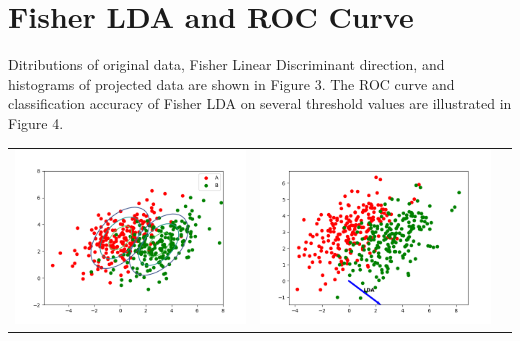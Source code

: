 \documentclass{article}
\begin{document}
\section{Fisher LDA and ROC Curve}
Ditributions of original data, Fisher Linear Discriminant direction, and histograms of projected data are shown in Figure 3. The ROC curve and classification accuracy of Fisher LDA on several threshold values are illustrated in Figure 4.
\begin{center}
\begin{tabular}{ccc}
\includegraphics[scale=0.25]{flda_roc_scatter} &
\includegraphics[scale=0.25]{discriminants} &

\end{tabular}
\end{center}
\end{document}

